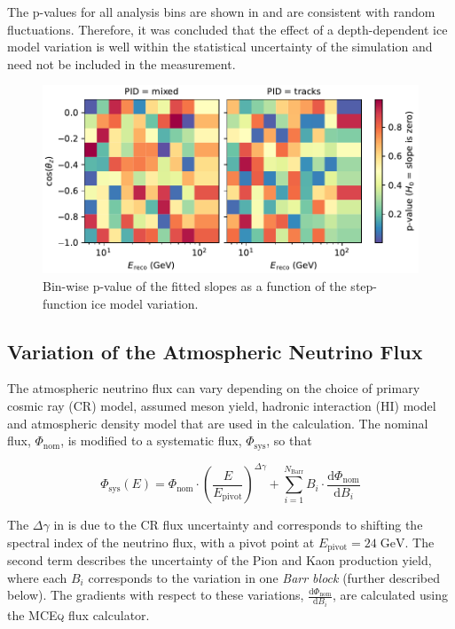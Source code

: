 The p-values for all analysis bins are shown in  and are consistent with random fluctuations.
Therefore, it was concluded that the effect of a depth-dependent ice model variation is well within the statistical uncertainty of the simulation and need not be included in the measurement.
\begin{figure}
    \centering
    \includegraphics[width=0.9\linewidth]{figures/measurement/systematics/detector/ice_perturbation/steppiness_slope_pvals_verification_sample.pdf}
    \caption{Bin-wise p-value of the fitted slopes as a function of the step-function ice model variation.}
    \label{fig:steppiness-pvals}
\end{figure}

\subsection{Variation of the Atmospheric Neutrino Flux}
\label{sec:flux_systs}

The atmospheric neutrino flux can vary depending on the choice of primary cosmic ray (CR) model, assumed meson yield, hadronic interaction (HI) model and atmospheric density model that are used in the calculation.
The nominal flux, $\Phi_\mathrm{nom}$, is modified to a systematic flux, $\Phi_\mathrm{sys}$, so that

\begin{equation}
    \Phi_{\mathrm{sys}}(E) = \Phi_{\mathrm{nom}} \cdot \left( \frac{E}{E_\mathrm{pivot}}\right)^{\Delta \gamma}
    +
    \sum_{i=1}^{N_\mathrm{Barr}} B_i \cdot \frac{\mathrm{d} \Phi_{\mathrm{nom}}}{\mathrm{d}B_i}\label{eq:flux-variation}
\end{equation}

The $\Delta \gamma$ in  is due to the CR flux uncertainty and corresponds to shifting the spectral index of the neutrino flux, with a pivot point at $E_\mathrm{pivot}=24\;\mathrm{GeV}$. The second term describes the uncertainty of the Pion and Kaon production yield, where each $B_i$ corresponds to the variation in one \emph{Barr block} (further described below). The gradients with respect to these variations, $\frac{\mathrm{d} \Phi_{\mathrm{nom}}}{\mathrm{d}B_i}$, are calculated using the \textsc{MCEq}\cite{mceq, fedynitch2012influence,fedynitch2015calculation} flux calculator.

